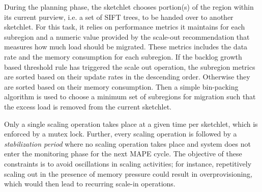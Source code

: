\documentclass[9pt,journal,compsoc]{IEEEtran}
\begin{document}
During the planning phase, the sketchlet chooses portion(s) of the region within its current purview, i.e. a set of SIFT trees, to be handed over to another sketchlet.
For this task, it relies on performance metrics it maintains for each subregion and a numeric value provided by the scale-out recommendation that measures how much load should be migrated.
These metrics includes the data rate and the memory consumption for each subregion.
If the backlog growth based threshold rule has triggered the scale out operation, the subregion metrics are sorted based on their update rates in the descending order. Otherwise they are sorted based on their memory consumption.
Then a simple bin-packing algorithm is used to choose a minimum set of subregions for migration such that the excess load is removed from the current sketchlet.

Only a single scaling operation takes place at a given time per sketchlet, which is enforced by a mutex lock.
Further, every scaling operation is followed by a \textit{stabilization period} where no scaling operation takes place and system does not enter the monitoring phase for the next MAPE cycle.
The objective of these constraints is to avoid oscillations in scaling activities; for instance, repetitively scaling out in the presence of memory pressure could result in overprovisioning, which would then lead to recurring scale-in operations.
%
\end{document}
